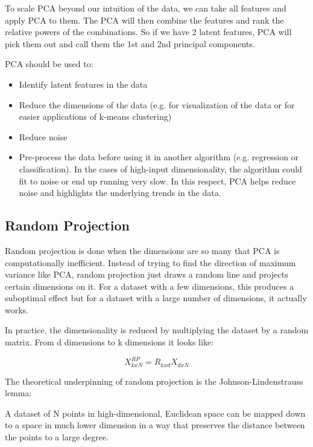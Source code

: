 \documentclass{article}
\begin{document}
To scale PCA beyond our intuition of the data, we can take all features and apply PCA to them. The PCA will then combine the features and rank the relative powers of the combinations. So if we have 2 latent features, PCA will pick them out and call them the 1st and 2nd principal components.

PCA should be used to:

\begin{itemize}
  \item Identify latent features in the data
  \item Reduce the dimensions of the data (e.g. for visualization of the data or for easier applications of k-means clustering)
  \item Reduce noise
  \item Pre-process the data before using it in another algorithm (e.g. regression or classification). In the cases of high-input dimensionality, the algorithm could fit to noise or end up running very slow. In this respect, PCA helps reduce noise and highlights the underlying trends in the data.
\end{itemize}

\subsection{Random Projection}
Random projection is done when the dimensions are so many that PCA is computationally inefficient. Instead of trying to find the direction of maximum variance like PCA, random projection just draws a random line and projects certain dimensions on it. For a dataset with a few dimensions, this produces a suboptimal effect but for a dataset with a large number of dimensions, it actually works.

In practice, the dimensionality is reduced by multiplying the dataset by a random matrix. From d dimensions to k dimensions it looks like:

\begin{equation}
  X_{kxN}^{RP} = R_{kxd} X_{dxN}
\end{equation}

The theoretical underpinning of random projection is the Johnson-Lindenstrauss lemma:

\begin{framed}
A dataset of N points in high-dimensional, Euclidean space can be mapped down to a space in much lower dimension in a way that preserves the distance between the points to a large degree.
\end{framed}
\end{document}
